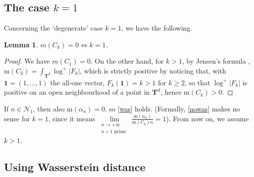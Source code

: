 \documentclass[12pt,reqno]{amsart}
\theoremstyle{definition}
\theoremstyle{plain}
\newtheorem{lemma}[theorem]{Lemma}
\theoremstyle{definition}
\newcommand{\T}{\mathbf{T}}
\newcommand\m{\mathrm{m}}
\newcommand\NN{{\mathcal N}}
\renewcommand{\geq}{\geqslant}
\begin{document}
\subsection{The case $k=1$} Concerning the `degenerate' case $k=1$, we have the following. 

 \begin{lemma} \label{pos}
$m(C_k)=0 \iff k=1$. 
\end{lemma} 
\begin{proof} We have $m(C_1)=0$.  On the other hand, for $k>1$, by Jensen's formula  \cite[Lemma 1.9]{EverestWard}, $\m(C_k) = \int_{\T^d} \log^+|F_k| $, which is strictly positive by noticing that, with $\mathbf 1=(1,\dots,1)$ the all-one vector, $F_k(\mathbf{1}) = k>1$ for $k \geq 2$, so that $\log^+|F_k|$ is positive on an open neighbourhood of a point in $\T^d$, hence $\m(C_k)>0$. 
\end{proof} 

If $n \in \NN_1$, then also $\m(\alpha_n)=0$, so \eqref{was} holds. (Formally, \eqref{nowas} makes no sense for $k=1$, since it means $\displaystyle{\lim\limits_{\substack{n \rightarrow + \infty \\ n+1 \text{ prime }}} \frac{\m(\alpha_n)}{\m(C_k) n} = 1}$). 
From now on, we assume $k>1$. 

\subsection{Using Wasserstein distance} 
\end{document}
